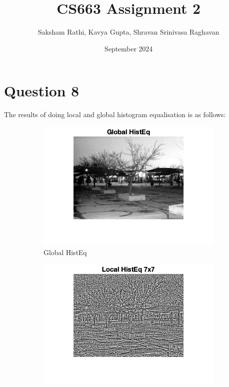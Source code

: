 \documentclass[12pt]{article}
\title{{\bf CS663 Assignment 2}}
\author{Saksham Rathi, Kavya Gupta, Shravan Srinivasa Raghavan}
\date{September 2024}
\begin{document}
\maketitle
\clearpage
\tableofcontents
\clearpage
\section*{Question 8}
    The results of doing local and global histogram equalisation is as follows:
    
    \begin{figure}[h!]
        \centering
        
        \begin{subfigure}[b]{0.3\textwidth}
            \centering
            \includegraphics[width=\textwidth]{../images/LC1_globalHistEq.png}
            \caption{Global HistEq}
        \end{subfigure}
        \hfill
        \begin{subfigure}[b]{0.3\textwidth}
            \centering
            \includegraphics[width=\textwidth]{../images/LC1_localHistEq_7x7.png}

\end{subfigure}
\end{figure}
\end{document}

